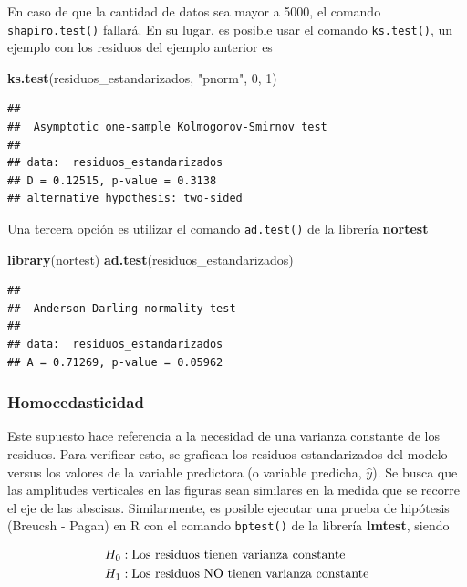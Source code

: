 \documentclass[
  11pt,
]{book}
\newenvironment{Shaded}{\begin{snugshade}}{\end{snugshade}}
\newcommand{\DecValTok}[1]{\textcolor[rgb]{0.00,0.00,0.81}{#1}}
\newcommand{\FunctionTok}[1]{\textcolor[rgb]{0.13,0.29,0.53}{\textbf{#1}}}
\newcommand{\NormalTok}[1]{#1}
\newcommand{\StringTok}[1]{\textcolor[rgb]{0.31,0.60,0.02}{#1}}
\theoremstyle{definition}
\theoremstyle{definition}
\theoremstyle{definition}
\theoremstyle{definition}
\theoremstyle{remark}
\begin{document}
En caso de que la cantidad de datos sea mayor a 5000, el comando \texttt{shapiro.test()} fallará. En su lugar, es posible usar el comando \texttt{ks.test()}, un ejemplo con los residuos del ejemplo anterior es

\begin{Shaded}
\begin{Highlighting}[]
\FunctionTok{ks.test}\NormalTok{(residuos\_estandarizados, }\StringTok{"pnorm"}\NormalTok{, }\DecValTok{0}\NormalTok{, }\DecValTok{1}\NormalTok{)}
\end{Highlighting}
\end{Shaded}

\begin{verbatim}
## 
##  Asymptotic one-sample Kolmogorov-Smirnov test
## 
## data:  residuos_estandarizados
## D = 0.12515, p-value = 0.3138
## alternative hypothesis: two-sided
\end{verbatim}

Una tercera opción es utilizar el comando \texttt{ad.test()} de la librería \textbf{nortest}

\begin{Shaded}
\begin{Highlighting}[]
\FunctionTok{library}\NormalTok{(nortest)}
\FunctionTok{ad.test}\NormalTok{(residuos\_estandarizados)}
\end{Highlighting}
\end{Shaded}

\begin{verbatim}
## 
##  Anderson-Darling normality test
## 
## data:  residuos_estandarizados
## A = 0.71269, p-value = 0.05962
\end{verbatim}

\subsubsection{Homocedasticidad}\label{homocedasticidad}

Este supuesto hace referencia a la necesidad de una varianza constante de los residuos. Para verificar esto, se grafican los residuos estandarizados del modelo versus los valores de la variable predictora (o variable predicha, \(\widehat{y}\)). Se busca que las amplitudes verticales en las figuras sean similares en la medida que se recorre el eje de las abscisas. Similarmente, es posible ejecutar una prueba de hipótesis (Breucsh - Pagan) en R con el comando \texttt{bptest()} de la librería \textbf{lmtest}, siendo

\begin{equation}
\notag
\begin{split}
H_0&: \text{Los residuos tienen varianza constante}\\
H_1&: \text{Los residuos NO tienen varianza constante}\\
\end{split}
\end{equation}
\end{document}
